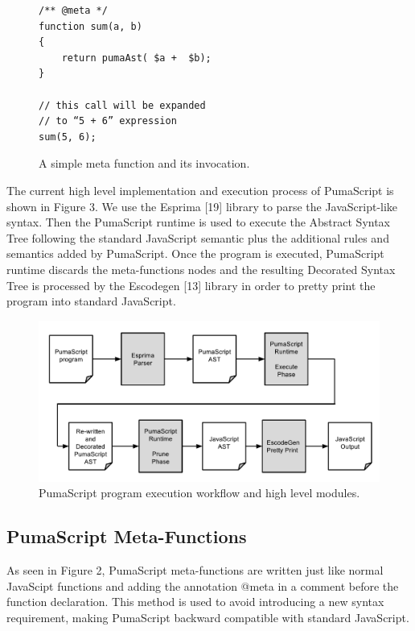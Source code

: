 \documentclass[preprint,10pt]{sigplanconf}
\begin{document}
\begin{figure}
\begin{lstlisting}
/** @meta */ 
function sum(a, b)
{
    return pumaAst( $a +  $b);
}

// this call will be expanded 
// to “5 + 6” expression
sum(5, 6); 
\end{lstlisting}
\caption{A simple meta function and its invocation.}
\label{fig:2}
\end{figure}

The current high level implementation and execution process of PumaScript is shown in Figure 3. We use the Esprima [19] library to parse the JavaScript-like syntax. Then the PumaScript runtime is used to execute the Abstract Syntax Tree following the standard JavaScript semantic plus the additional rules and semantics added by PumaScript. Once the program is executed, PumaScript runtime discards the meta-functions nodes and the resulting Decorated Syntax Tree is processed by the Escodegen [13] library in order to pretty print the program into standard JavaScript.

\begin{figure}
\begin{center}
	\includegraphics[width=1\textwidth]{puma-stack}
\end{center}
\caption{PumaScript program execution workflow and high level modules.}
\label{fig:3}
\end{figure}

\subsection{PumaScript Meta-Functions}
As seen in Figure 2, PumaScript meta-functions are written just like normal JavaScipt functions and adding the annotation @meta in a comment before the function declaration. This method is used to avoid introducing a new syntax requirement, making PumaScript backward compatible with standard JavaScript.
\end{document}
